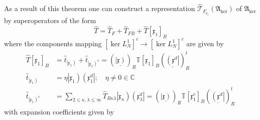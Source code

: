 \documentclass[aps,preprint]{revtex4}%
\begin{document}
As a result of this theorem one can construct a representation $\mathcal{\hat
{T}}_{F_{\mathfrak{x}_{1}}}\left(  \mathfrak{A}_{\ker}\right)  $ of
$\mathfrak{A}_{\ker}$ by superoperators of the form
\begin{equation}
\hat{T}=\hat{T}_{F}+\hat{T}_{FB}+\hat{T}\left[  \mathfrak{x}_{1}\right]  _{B}%
\end{equation}
where the components mapping $\left[  \ker L_{N}^{1}\right]  ^{c}%
\rightarrow\left[  \ker L_{N}^{1}\right]  ^{c}$ are given by%
\begin{align}
\hat{T}\left[  \mathfrak{x}_{1}\right]  _{B}  &  =\hat{t}_{\left\vert
\mathfrak{x}_{1}\right)  }+\hat{t}_{\left\vert \mathfrak{x}_{1}\right)  ^{c}%
}=\left(  \underline{\left\vert \mathfrak{x}\right)  }\right)  _{R}%
\mathbb{T}\left[  \mathfrak{x}_{1}\right]  _{B}\left(  \underline{\left(
\mathfrak{x}^{d}\right\vert }\right)  _{R}^{t}\nonumber\\
\hat{t}_{\left\vert \mathfrak{x}_{1}\right)  }  &  =\eta\left\vert
\mathfrak{x}_{1}\right)  \left(  \mathfrak{x}_{1}^{d}\right\vert ;\quad
\eta\neq0\in\mathbb{C}\nonumber\\
\hat{t}_{\left\vert \mathfrak{x}_{1}\right)  ^{c}}  &  =%
{\displaystyle\sum\limits_{2\leq\kappa,\lambda\leq\infty}}
\hat{T}_{B\kappa\lambda}\left\vert \mathfrak{x}_{\kappa}\right)  \left(
\mathfrak{x}_{\lambda}^{d}\right\vert =\left(  \underline{\left\vert
\mathfrak{x}\right)  }\right)  _{R}\mathbb{T}\left[  \mathfrak{x}_{1}%
^{c}\right]  _{B}\left(  \underline{\left(  \mathfrak{x}^{d}\right\vert
}\right)  _{R}^{t}%
\end{align}
with expansion coefficients given by
\end{document}
